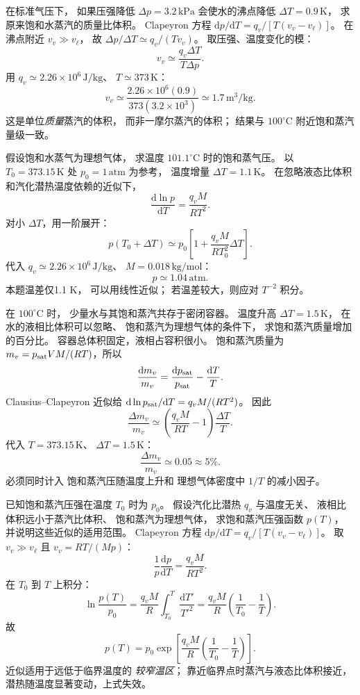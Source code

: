 在标准气压下，
如果压强降低 $\Delta p=3.2\,\mathrm{kPa}$
会使水的沸点降低 $\Delta T=0.9\,\mathrm K$，
求原来饱和水蒸汽的质量比体积。
\exsolution
Clapeyron 方程
$\mathrm dp/\mathrm dT=
q_v/[T(v_v-v_\ell)]$。
在沸点附近
$v_v\gg v_\ell$，
故
$\Delta p/\Delta T
\simeq q_v/(T v_v)$。
取压强、温度变化的模：
\[
\boxed{v_v\simeq\frac{q_v\Delta T}{T\Delta p}}.
\]
用
$q_v\simeq2.26\times10^6\,\mathrm{J/kg}$、
$T\simeq373\,\mathrm K$：
\[
\boxed{v_v\simeq
\frac{2.26\times10^6(0.9)}{373(3.2\times10^3)}
\simeq1.7\,\mathrm{m^3/kg}}.
\]
\excheck 这是单位\emph{质量}蒸汽的体积，
而非一摩尔蒸汽的体积；
结果与 $100^\circ\mathrm C$ 附近饱和蒸汽量级一致。

假设饱和水蒸气为理想气体，
求温度
$101.1^\circ\mathrm C$ 时的饱和蒸气压。
\exsolution
以 $T_0=373.15\,\mathrm K$
处 $p_0=1\,\mathrm{atm}$ 为参考，
温度增量
$\Delta T=1.1\,\mathrm K$。
在忽略液态比体积和汽化潜热温度依赖的近似下，
\[
\frac{\mathrm d\ln p}{\mathrm dT}
=\frac{q_vM}{RT^2}.
\]
对小 $\Delta T$，用一阶展开：
\[
p(T_0+\Delta T)
\simeq p_0\left[
1+\frac{q_vM}{RT_0^2}\Delta T\right].
\]
代入
$q_v\simeq2.26\times10^6\,\mathrm{J/kg}$、
$M=0.018\,\mathrm{kg/mol}$：
\[
\boxed{p\simeq1.04\,\mathrm{atm}}.
\]
\excheck 本题温差仅1.1 K，
可以用线性近似；
若温差较大，则应对 $T^{-2}$ 积分。

在 $100^\circ\mathrm C$ 时，
少量水与其饱和蒸汽共存于密闭容器。
温度升高 $\Delta T=1.5\,\mathrm K$，
在水的液相比体积可以忽略、
饱和蒸汽为理想气体的条件下，
求饱和蒸汽质量增加的百分比。
\exsolution
容器总体积固定，液相占容积很小。
饱和蒸汽质量为
$m_v=p_{\rm sat}VM/(RT)$，所以
\[
\frac{\mathrm dm_v}{m_v}
=\frac{\mathrm dp_{\rm sat}}{p_{\rm sat}}
-\frac{\mathrm dT}{T}.
\]
Clausius--Clapeyron 近似给
$\mathrm d\ln p_{\rm sat}/\mathrm dT
=q_vM/(RT^2)$。
因此
\[
\frac{\Delta m_v}{m_v}
\simeq
\left(\frac{q_vM}{RT}-1\right)\frac{\Delta T}{T}.
\]
代入 $T=373.15\,\mathrm K$、
$\Delta T=1.5\,\mathrm K$：
\[
\boxed{\frac{\Delta m_v}{m_v}\simeq0.05
\approx5\%}.
\]
\excheck 必须同时计入
饱和蒸汽压随温度上升和
理想气体密度中 $1/T$ 的减小因子。

已知饱和蒸汽压强在温度 $T_0$ 时为 $p_0$。
假设汽化比潜热 $q_v$ 与温度无关、
液相比体积远小于蒸汽比体积、
饱和蒸汽为理想气体，
求饱和蒸汽压强函数 $p(T)$，
并说明这些近似的适用范围。
\exsolution
Clapeyron 方程
$\mathrm dp/\mathrm dT
=q_v/[T(v_v-v_\ell)]$。
取 $v_v\gg v_\ell$ 且
$v_v=RT/(Mp)$：
\[
\frac1p\frac{\mathrm dp}{\mathrm dT}
=\frac{q_vM}{RT^2}.
\]
在 $T_0$ 到 $T$ 上积分：
\[
\ln\frac{p(T)}{p_0}
=\frac{q_vM}{R}
\int_{T_0}^{T}\frac{\mathrm dT'}{T'^2}
=\frac{q_vM}{R}
\left(\frac1{T_0}-\frac1T\right).
\]
故
\[
\boxed{p(T)=p_0
\exp\left[\frac{q_vM}{R}
\left(\frac1{T_0}-\frac1T\right)\right]}.
\]
\excheck 近似适用于远低于临界温度的
\emph{较窄温区}；
靠近临界点时蒸汽与液态比体积接近，
潜热随温度显著变动，上式失效。

